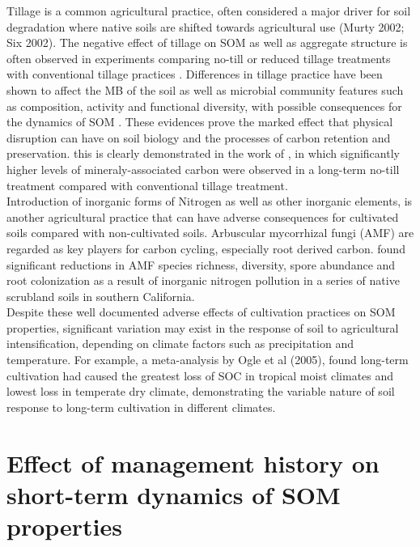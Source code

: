 \documentclass[12pt]{report}
\begin{document}
		Tillage is a common agricultural practice, often considered a major driver for soil degradation where native soils are shifted towards agricultural use (Murty 2002; Six 2002). The negative effect of tillage on SOM as well as aggregate structure is often observed in experiments comparing no-till or reduced tillage treatments with conventional tillage practices \citep{six1998, west2002}.
		Differences in tillage practice have  been shown to affect the MB of the soil \citep{jat2020, alvaro-fuentes2009, sun2011} as well as
		microbial community features such as composition, activity and functional diversity, with possible consequences for the dynamics of SOM \citep{vangroenigen2010, govaerts2007}. These evidences prove the marked effect that physical disruption can have on soil biology and the processes of carbon retention and preservation. this is clearly demonstrated in the work of \citet{plaza2013}, in which significantly higher levels of mineraly-associated carbon were observed in a long-term no-till treatment compared with conventional tillage treatment.\\ Introduction of inorganic forms of Nitrogen as well as other inorganic elements, is another agricultural practice that can have adverse consequences for cultivated soils compared with non-cultivated soils. Arbuscular mycorrhizal fungi (AMF) are regarded as key players for carbon cycling, especially root derived carbon. \citet{egerton-warburton2000} found significant reductions in AMF  species richness, diversity, spore abundance and root colonization as a result of inorganic nitrogen pollution in a series of native scrubland soils in southern California. \\
		Despite these well documented adverse effects of cultivation practices on SOM properties, significant variation may exist in the response of soil to agricultural intensification, depending on climate factors such as precipitation and temperature. For example, a meta-analysis by Ogle et al (2005), found long-term cultivation had caused the greatest loss of SOC in tropical moist climates and lowest loss in temperate dry climate, demonstrating the variable nature of soil response to long-term cultivation in different climates.\\   
		
\section{Effect of management history on short-term dynamics of SOM properties}
	
\end{document}
